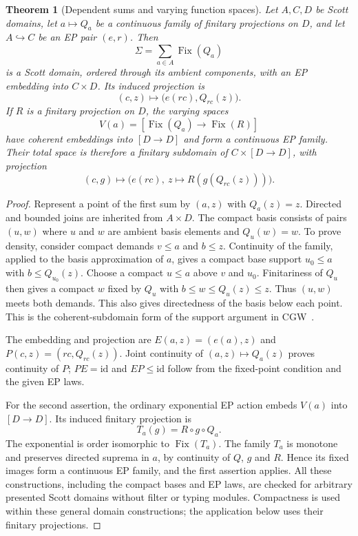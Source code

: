 \documentclass[11pt,a4paper]{article}
\newtheorem{theorem}{Theorem}[section]
\theoremstyle{definition}
\theoremstyle{remark}
\begin{document}
\begin{theorem}[Dependent sums and varying function spaces]\label{thm:sum-subdomain}
Let $A,C,D$ be Scott domains, let $a\mapsto Q_a$ be a continuous
family of finitary projections on $D$, and let $A\hookrightarrow C$
be an EP pair $(e,r)$. Then
\[
 \Sigma=\sum_{a\in A}\operatorname{Fix}(Q_a)
\]
is a Scott domain, ordered through its ambient components, with an EP
embedding into $C\times D$. Its induced projection is
\[
 (c,z)\longmapsto \bigl(e(rc),Q_{rc}(z)\bigr).
\]
If $R$ is a finitary projection on $D$, the varying spaces
\[
 V(a)=[\operatorname{Fix}(Q_a)\to\operatorname{Fix}(R)]
\]
have coherent embeddings into $[D\to D]$ and form a continuous EP
family. Their total space is therefore a finitary subdomain of
$C\times[D\to D]$, with projection
\[
 (c,g)\longmapsto
 \bigl(e(rc),\ z\mapsto R(g(Q_{rc}(z)))\bigr).
\]
\end{theorem}
\begin{proof}
Represent a point of the first sum by $(a,z)$ with $Q_a(z)=z$.
Directed and bounded joins are inherited from $A\times D$.
The compact basis consists of pairs $(u,w)$ where $u$ and $w$ are
ambient basis elements and $Q_u(w)=w$.
To prove density, consider compact demands $v\leq a$ and $b\leq z$.
Continuity of the family, applied to the basis approximation of $a$,
gives a compact base support $u_0\leq a$ with $b\leq Q_{u_0}(z)$.
Choose a compact $u\leq a$ above $v$ and $u_0$. Finitariness of $Q_u$
then gives a compact $w$ fixed by $Q_u$ with
$b\leq w\leq Q_u(z)\leq z$. Thus $(u,w)$ meets both demands.
This also gives directedness of the basis below each point.
This is the coherent-subdomain form of the support argument in
CGW~\cite[Proposition~7, pp.~132--134]{cgw}.

The embedding and projection are
$E(a,z)=(e(a),z)$ and $P(c,z)=(rc,Q_{rc}(z))$.
Joint continuity of $(a,z)\mapsto Q_a(z)$ proves continuity of $P$;
$PE=\mathrm{id}$ and $EP\leq\mathrm{id}$ follow from the fixed-point
condition and the given EP laws.

For the second assertion, the ordinary exponential EP action embeds
$V(a)$ into $[D\to D]$. Its induced finitary projection is
\[
 T_a(g)=R\circ g\circ Q_a.
\]
The exponential is order isomorphic to $\operatorname{Fix}(T_a)$.
The family $T_a$ is monotone and preserves directed suprema in $a$,
by continuity of $Q$, $g$ and $R$. Hence its fixed images form a
continuous EP family, and the first assertion applies.
All these constructions, including the compact bases and EP laws, are
checked for arbitrary presented Scott domains without filter or typing
modules. Compactness is used within these general domain constructions;
the application below uses their finitary projections.
\end{proof}
\end{document}
